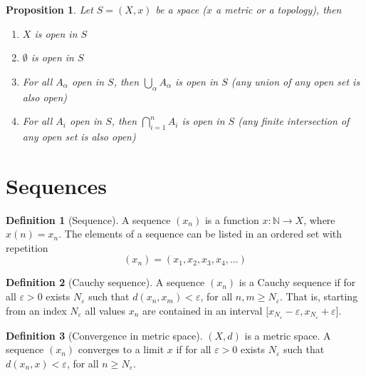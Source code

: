 \documentclass{article}
\newenvironment{enumrom}{\begin{enumerate}[label=(\roman*)]}{\end{enumerate}}
\newcommand{\f}[3]{#1 : #2 \rightarrow #3}
\theoremstyle{definition}
\newtheorem{definition}{Definition}[section]
\theoremstyle{definition}
\theoremstyle{plain}
\theoremstyle{plain}
\theoremstyle{plain}
\theoremstyle{plain}
\newtheorem{proposition}[theorem]{Proposition}
\theoremstyle{definition}
\theoremstyle{remark}
\theoremstyle{remark}
\theoremstyle{remark}
\theoremstyle{remark}
\newcommand{\N}{\mathbb{N}}
\newcommand{\E}{\varepsilon}
\begin{document}
\begin{proposition}
  Let $S = (X, x)$ be a space ($x$ a metric or a topology), then
  \begin{enumrom}
  \item $X$ is open in $S$
  \item $\emptyset$ is open in $S$
  \item For all $A_\alpha$ open in $S$, then $\displaystyle \bigcup_\alpha A_\alpha$ is open in $S$ (any union of any open set is also open)
  \item For all $A_i$ open in $S$, then $\displaystyle \bigcap_{i=1}^n A_i$ is open in $S$ (any finite intersection of any open set is also open)
  \end{enumrom}
\end{proposition}


\section{Sequences}


\begin{definition}[Sequence]
  A sequence $(x_n)$ is a function $\f{x}{\N}{X}$, where $x(n) = x_n$. The elements of a sequence can be listed in an ordered set with repetition
  \[
  (x_n) = (x_1, x_2, x_3, x_4, \hdots)
  \]
\end{definition}





\begin{definition}[Cauchy sequence]
  A sequence $(x_n)$ is a Cauchy sequence if for all $\E > 0$ exists $N_\E$ such that $d(x_n,x_m) < \E$, for all $n, m \geq N_\E$. That is, starting from an index $N_\E$ all values $x_n$ are contained in an interval ${[}x_{N_\E} - \E, x_{N_\E} + \E{]}$.
\end{definition}



\begin{definition}[Convergence in metric space]
  $(X, d)$ is a metric space. A sequence $(x_n)$ converges to a limit $x$ if for all $\E > 0$ exists $N_\E$ such that $d(x_n,x) < \E$, for all $n \geq N_\E$.
\end{definition}
\end{document}
